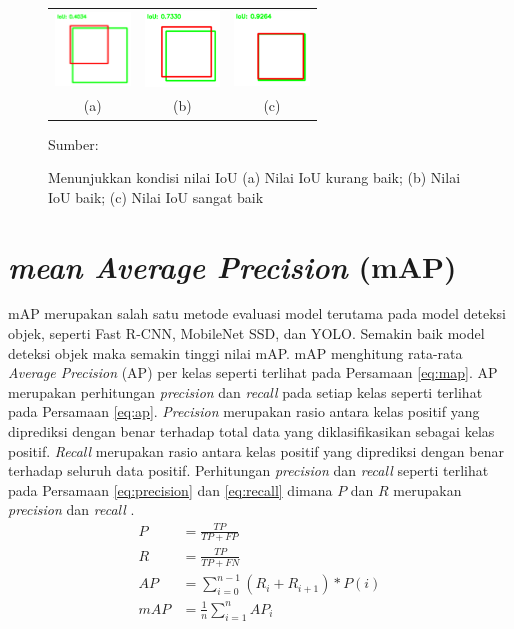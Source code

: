 \begin{figure}[H]
    \centering
    \begin{tabular}{ccc}
        \includegraphics[width=2cm]{../img/IoU Poor - Latex.PNG}
        &
        \includegraphics[width=2cm]{../img/IoU Good - Latex.PNG}
        &
        \includegraphics[width=2cm]{../img/IoU Excellent - Latex.PNG}\\
        (a) &(b) &(c)\\
    \end{tabular}
    \caption{Menunjukkan kondisi nilai IoU (a) Nilai IoU kurang baik; (b) Nilai IoU baik; (c) Nilai IoU sangat baik}
    \label{fig:iou-cat}
    Sumber: \citep{Cowton2019}
\end{figure}

\section{\textit{mean Average Precision} (mAP)}
mAP merupakan salah satu metode evaluasi model terutama pada model deteksi objek, seperti Fast R-CNN, MobileNet SSD, dan YOLO. Semakin baik model deteksi objek maka semakin tinggi nilai mAP. mAP menghitung rata-rata \textit{Average Precision} (AP) per kelas seperti terlihat pada Persamaan \ref{eq:map}. AP merupakan perhitungan \textit{precision} dan \textit{recall} pada setiap kelas seperti terlihat pada Persamaan \ref{eq:ap}. \textit{Precision} merupakan rasio antara kelas positif yang diprediksi dengan benar terhadap total data yang diklasifikasikan sebagai kelas positif. \textit{Recall} merupakan rasio antara kelas positif yang diprediksi dengan benar terhadap seluruh data positif. Perhitungan \textit{precision} dan \textit{recall} seperti terlihat pada Persamaan \ref{eq:precision} dan \ref{eq:recall} dimana $P$ dan $R$ merupakan \textit{precision} dan \textit{recall} \citep{Shultz2017}.
\begin{align}
    \label{eq:precision}
    P &= \frac{TP}{TP+FP}\\
    \label{eq:recall}
    R &= \frac{TP}{TP+FN}\\
    \label{eq:ap}
    AP &= \sum_{i=0}^{n-1} (R_i+R_{i+1})\ast P(i)\\
    \label{eq:map}
    mAP &= \frac{1}{n}\sum_{i=1}^{n} AP_i
\end{align}



